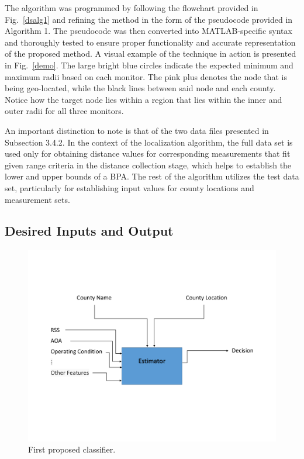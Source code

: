 \documentclass[12pt]{uthesis-v12}  %
\begin{document}
The algorithm was programmed by following the flowchart provided in Fig.~\ref{dsalg1} and refining the method in the form of the pseudocode provided in Algorithm 1. The pseudocode was then converted into MATLAB-specific syntax and thoroughly tested to ensure proper functionality and accurate representation of the proposed method. A visual example of the technique in action is presented in Fig.~\ref{demo}. The large bright blue circles indicate the expected minimum and maximum radii based on each monitor. The pink plus denotes the node that is being geo-located, while the black lines between said node and each county. Notice how the target node lies within a region that lies within the inner and outer radii for all three monitors.

An important distinction to note is that of the two data files presented in Subsection 3.4.2. In the context of the localization algorithm, the full data set is used only for obtaining distance values for corresponding measurements that fit given range criteria in the distance collection stage, which helps to establish the lower and upper bounds of a BPA. The rest of the algorithm utilizes the test data set, particularly for establishing input values for county locations and measurement sets.

\subsection{Desired Inputs and Output}

\begin{figure}[!t]
\centering
\includegraphics[width=6in]{classifier2}
\caption{First proposed classifier.}
\label{class1}
\end{figure}
\end{document}
